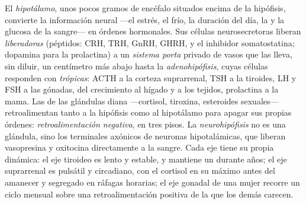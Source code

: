 \begin{definition}\label{def:b3:endocrinology:axes}
El \emph{hipotálamo}, unos pocos gramos de encéfalo situados encima de
la hipófisis, convierte la información neural ---el estrés, el frío, la
duración del día, la  y la glucosa de la sangre--- en
órdenes hormonales. Sus células neurosecretoras liberan \emph{
liberadoras} (péptidos: CRH, TRH, GnRH, GHRH, y el inhibidor
somatostatina; dopamina para la prolactina) a un \emph{sistema porta}
privado de vasos que las lleva, sin diluir, un centímetro más abajo
hasta la \emph{adenohipófisis}, cuyas células responden con
\emph{ trópicas}: ACTH a la corteza suprarrenal, TSH a la
tiroides, LH y FSH a las gónadas,  del crecimiento al hígado y
a los tejidos, prolactina a la mama. Las  de las glándulas
diana ---cortisol, tiroxina, esteroides sexuales--- retroalimentan
tanto a la hipófisis como al hipotálamo para apagar sus propias
órdenes: \emph{retroalimentación negativa}, en tres pisos. La
\emph{neurohipófisis} no es una glándula, sino los terminales axónicos
de neuronas hipotalámicas, que liberan vasopresina y oxitocina
directamente a la sangre. Cada eje tiene su propia dinámica: el eje
tiroideo es lento y estable, y mantiene un  durante
años; el eje suprarrenal es pulsátil y circadiano, con el cortisol en
su máximo antes del amanecer y segregado en ráfagas horarias; el eje
gonadal de una mujer recorre un ciclo mensual sobre una
retroalimentación positiva de la que los demás carecen.
\end{definition}


